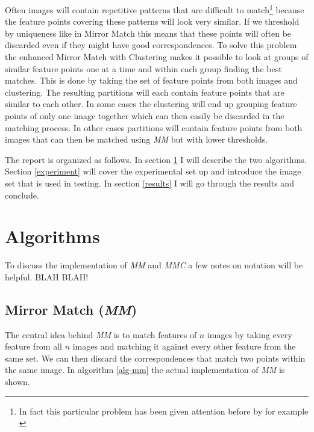 \documentclass{article}
\begin{document}
Often images will contain repetitive patterns that are difficult to 
match\footnote{In fact this particular problem has been given attention 
before by for example \cite{fan2011towards}} because the feature points 
covering these patterns will look very similar. If we threshold by 
uniqueness like in Mirror Match this means that these points will often 
be discarded even if they might have good correspondences. To solve this 
problem the enhanced Mirror Match with Clustering makes it possible to 
look at groups of similar feature points one at a time and within each 
group finding the best matches. This is done by taking the set of 
feature points from both images and clustering. The resulting partitions 
will each contain feature points that are similar to each other. In some 
cases the clustering will end up grouping feature points of only one 
image together which can then easily be discarded in the matching 
process. In other cases partitions will contain feature points from both 
images that can then be matched using \emph{MM} but with lower 
thresholds.

The report is organized as follows. In section \ref{algorithms} I will 
describe the two algorithms. Section \ref{experiment} will cover the 
experimental set up and introduce the image set that is used in testing.  
In section \ref{results} I will go through the results and conclude.

\section{Algorithms}
\label{algorithms}

To discuss the implementation of \emph{MM} and \emph{MMC} a few notes on 
notation will be helpful. BLAH BLAH!

\subsection{Mirror Match (\emph{MM})}

The central idea behind \emph{MM} is to match features of $n$ images by 
taking every feature from all $n$ images and matching it against every 
other feature from the same set. We can then discard the correspondences 
that match two points within the same image. In algorithm \ref{alg-mm} 
the actual implementation of \emph{MM} is shown.
\end{document}
